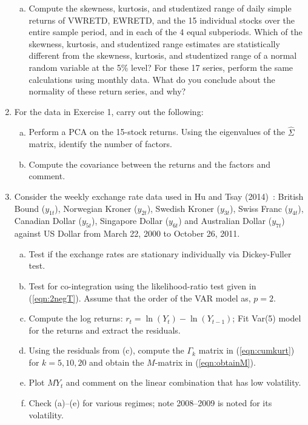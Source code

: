 \begin{enumerate}[1.]
\begin{enumerate}[(a)]
	\item Compute the skewness, kurtosis, and studentized range of daily simple returns of VWRETD, EWRETD, and the 15 individual stocks over the entire sample period, and in each of the 4 equal subperiods. Which of the skewness, kurtosis, and studentized range estimates are statistically different from the skewness, kurtosis, and studentized range of a normal random variable at the 5\% level? For these 17 series, perform the same calculations using monthly data. What do you conclude about the normality of these return series, and why?
	\end{enumerate}



\item For the data in Exercise 1, carry out the following:
	\begin{enumerate}[(a)]
	\item Perform a PCA on the 15-stock returns. Using the eigenvalues of the $\hat{\Sigma}$ matrix, identify the number of factors.
	\item Compute the covariance between the returns and the factors and comment. 
	\end{enumerate}



\item Consider the weekly exchange rate data used in Hu and Tsay (2014)~\cite{hutsay14}: British Bound ($y_{1t}$), Norwegian Kroner ($y_{2t}$), Swedish Kroner ($y_{3t}$), Swiss Franc ($y_{4t}$), Canadian Dollar ($y_{5t}$), Singapore Dollar ($y_{6t}$) and Australian Dollar ($y_{7t}$) against US Dollar from March 22, 2000 to October 26, 2011.
	\begin{enumerate}[(a)]
	\item Test if the exchange rates are stationary individually via Dickey-Fuller test.
	\item Test for co-integration using the likelihood-ratio test given in (\ref{eqn:2negT}). Assume that the order of the VAR model as, $p=2$.
	\item Compute the log returns: $r_t=\ln(Y_t) - \ln(Y_{t-1})$; Fit Var(5) model for the returns and extract the residuals. 
	\item Using the residuals from (c), compute the $\Gamma_k$ matrix in (\ref{eqn:cumkurt}) for $k=5, 10, 20$ and obtain the $M$-matrix in (\ref{eqn:obtainM}).
	\item Plot $MY_t$ and comment on the linear combination that has low volatility. 
	\item Check (a)--(e) for various regimes; note 2008--2009 is noted for its volatility. 
	\end{enumerate}












\end{enumerate}




	
	


